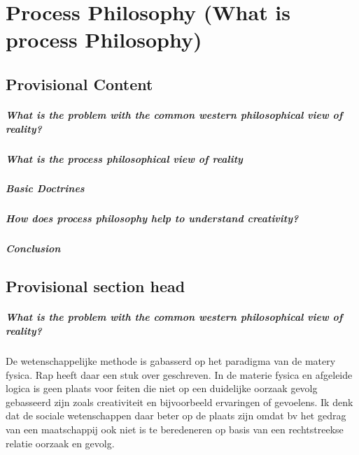 \chapter{Process Philosophy (What is process Philosophy)}

\section{Provisional Content}
\paragraph{What is the problem with the common western philosophical view of reality?}
\paragraph{What is the process philosophical view of reality}
\paragraph{Basic Doctrines}
\paragraph{How does process philosophy help to understand creativity?}
\paragraph{Conclusion}

\section{Provisional section head}




\paragraph{What is the problem with the common western philosophical view of reality?}
De wetenschappelijke methode is gabasserd op het paradigma van de matery fysica.
Rap heeft daar een stuk over geschreven.
In de materie fysica en afgeleide logica is geen plaats voor feiten die niet op een duidelijke oorzaak gevolg gebasseerd zijn zoals creativiteit en bijvoorbeeld ervaringen of gevoelens.
Ik denk dat de sociale wetenschappen daar beter op de plaats zijn omdat bv het gedrag van een maatschappij ook niet is te beredeneren op basis van een rechtstreekse relatie oorzaak en gevolg.







